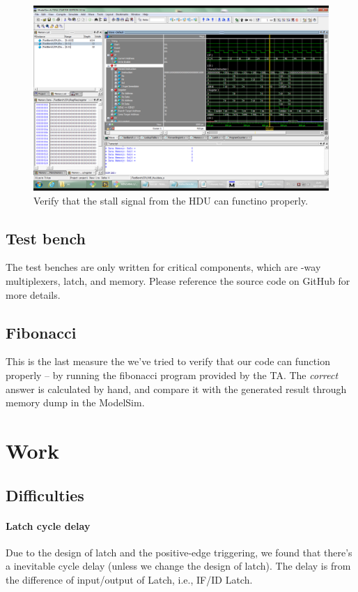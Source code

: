 \documentclass[11pt, a4paper]{article}
\begin{document}
\begin{figure}[H]
\includegraphics[width=\textwidth]{stall}
\caption{Verify that the stall signal from the HDU can functino properly.}
\end{figure}

\subsection{Test bench}
The test benches are only written for critical components, which are {-way multiplexers}, {\sc latch}, and {\sc memory}. Please reference the source code on GitHub for more details.

\subsection{Fibonacci}
This is the last measure the we've tried to verify that our code can function properly -- by running the fibonacci program provided by the TA. The \textit{correct} answer is calculated by hand, and compare it with the generated result through memory dump in the ModelSim.

\section{Work}
\subsection{Difficulties}

\paragraph{Latch cycle delay}
Due to the design of latch and the positive-edge triggering, we found that there's a inevitable cycle delay (unless we change the design of latch). The delay is from the difference of input/output of Latch, i.e., IF/ID Latch.
\end{document}

